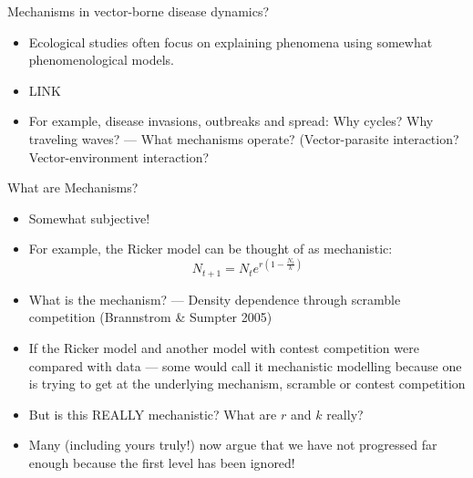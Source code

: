 \documentclass[xcolor=x11names,compress]{beamer}
\renewcommand{\(}{\begin{columns}}
\renewcommand{\)}{\end{columns}}
\newcommand{\<}[1]{\begin{column}{#1}}
\renewcommand{\>}{\end{column}}
\begin{document}
\begin{frame}{Mechanisms in vector-borne disease dynamics?}

\begin{itemize}[<+->] \itemsep4pt
	\item Ecological studies often focus on explaining phenomena 
	using somewhat phenomenological models. 
	
	\item LINK

	\item For example, disease invasions, outbreaks and spread: Why cycles? Why traveling waves? \pause --- What mechanisms operate?
	(Vector-parasite interaction? Vector-environment interaction? 
\end{itemize}

\end{frame}

\begin{frame}{What are Mechanisms?}

   \begin{itemize}[<+->] \itemsep4pt{}
			\item Somewhat subjective! 
			\item For example, the Ricker model can be thought of as 
			mechanistic:
			\begin{equation} 
				N_{t+1} = N_t e^{r\left(1-\frac{N_t}{k}\right)} 
			\end{equation} 
				
			\item What is the mechanism? --- Density dependence through scramble competition 
			(Brannstrom \& Sumpter 2005)

			\item If the Ricker model and another model with contest 
			competition were compared with data --- some would call it mechanistic 
			modelling because one is trying to get at the underlying 
			mechanism, scramble or contest competition
			
			\item But is this REALLY mechanistic? What are $r$ and $k$ really?
	
			\item Many (including yours truly!) now argue that we have not 
			progressed far enough because the first level has been ignored!
   \end{itemize}

\end{frame}
\end{document}
